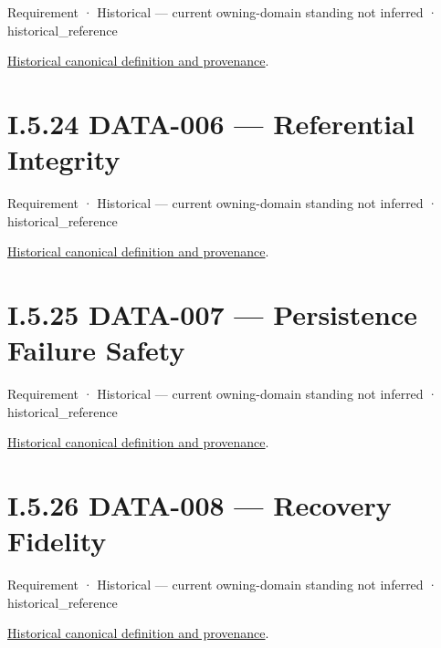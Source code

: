 \label{element:7f40b2f4947845d287564b43f812b6c8}
{\small Requirement · Historical — current owning-domain standing not inferred · historical\_reference}\par
\href{../../../../continuum/motivation/requirement/7f40b2f4947845d287564b43f812b6c8.md}{Historical canonical definition and provenance}.\par
\section*{I.5.24 DATA-006 — Referential Integrity}
\label{navigation:I.5.24}

\label{element:4a8a79f520394cfe863f473ec2a31b34}
{\small Requirement · Historical — current owning-domain standing not inferred · historical\_reference}\par
\href{../../../../continuum/motivation/requirement/4a8a79f520394cfe863f473ec2a31b34.md}{Historical canonical definition and provenance}.\par
\section*{I.5.25 DATA-007 — Persistence Failure Safety}
\label{navigation:I.5.25}

\label{element:40ed2565d0d1467cbbfcf5706924de94}
{\small Requirement · Historical — current owning-domain standing not inferred · historical\_reference}\par
\href{../../../../continuum/motivation/requirement/40ed2565d0d1467cbbfcf5706924de94.md}{Historical canonical definition and provenance}.\par
\section*{I.5.26 DATA-008 — Recovery Fidelity}
\label{navigation:I.5.26}

\label{element:7c7a33be31d042459adb83c71ae044fa}
{\small Requirement · Historical — current owning-domain standing not inferred · historical\_reference}\par
\href{../../../../continuum/motivation/requirement/7c7a33be31d042459adb83c71ae044fa.md}{Historical canonical definition and provenance}.\par
